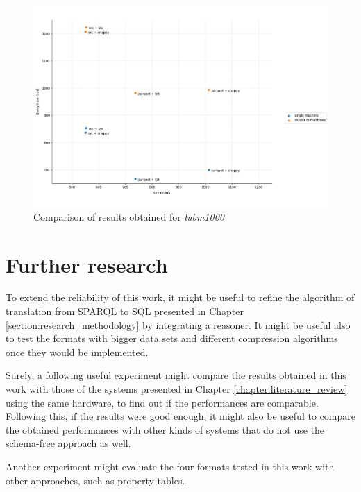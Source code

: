 \documentclass[10pt, a4paper]{report}
\begin{document}
\begin{figure}
	\centering
	\includegraphics[width=13cm]{./assets/img/comparisons.png}
	\caption{Comparison of results obtained for \textit{lubm1000}}
	\label{fig:result_comparison}
	\vspace{0.5cm}
\end{figure}

\section{Further research}

To extend the reliability of this work, it might be useful to refine the algorithm of translation from SPARQL to SQL presented in Chapter \ref{section:research_methodology} by integrating a reasoner. It might be useful also to test the formats with bigger data sets and different compression algorithms once they would be implemented.

Surely, a following useful experiment might compare the results obtained in this work with those of the systems presented in Chapter \ref{chapter:literature_review} using the same hardware, to find out if the performances are comparable. Following this, if the results were good enough, it might also be useful to compare the obtained performances with other kinds of systems that do not use the schema-free approach as well.

Another experiment might evaluate the four formats tested in this work with other approaches, such as property tables.



\clearpage
\end{document}
